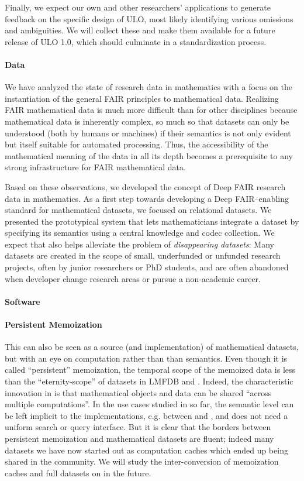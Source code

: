 Finally, we expect our own and other researchers' applications to generate feedback on the specific design of ULO, most likely identifying various omissions and ambiguities.
We will collect these and make them available for a future release of ULO 1.0, which should culminate in a standardization process.

\paragraph{Data}
We have analyzed the state of research data in mathematics with a focus on the instantiation of the general FAIR principles to mathematical data.
Realizing FAIR mathematical data is much more difficult than for other disciplines because mathematical data is inherently complex, so much so that datasets can only be understood (both by humans or machines) if their semantics is not only evident but itself suitable for automated processing.
Thus, the accessibility of the mathematical meaning of the data in all its depth becomes a prerequisite to any strong infrastructure for FAIR mathematical data.

Based on these observations, we developed the concept of Deep FAIR research data in mathematics.
As a first step towards developing a Deep FAIR--enabling standard for mathematical datasets, we focused on relational datasets.
We presented the prototypical \dmh system that lets mathematicians integrate a dataset by specifying its semantics using a central knowledge and codec collection.
We expect that \dmh also helps alleviate the problem of \emph{disappearing datasets}:
Many datasets are created in the scope of small, underfunded or unfunded research projects, often by junior researchers or PhD students, and are often abandoned when developer change research areas or pursue a non-academic career.

\paragraph{Software}

\paragraph{Persistent Memoization}
This can also be seen as a source (and implementation) of mathematical datasets, but with an eye on computation rather than than semantics.
Even though it is called ``persistent'' memoization, the temporal scope of the memoized data is less than the ``eternity-scope'' of datasets in LMFDB and \dmh. Indeed, the characteristic innovation in  is that mathematical objects and data can be shared ``across multiple computations''.
In the use cases studied in \pn so far, the semantic level can be left implicit to the implementations, e.g. between \Sage and \GAP, and does not need a uniform search or query interface.
But it is clear that the borders between persistent memoization and mathematical datasets are fluent; indeed many datasets we have now started out as computation caches which ended up being shared in the community. 
We will study the inter-conversion of memoization caches and full datasets on \dmh in the future. 


